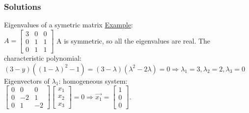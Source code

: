 \begin{frame}
	\frametitle{Solutions}
	\begin{block}{Eigenvalues of a symetric matrix}
		\underline{Example}:\\
		$A=\begin{bmatrix}
		3 & 0 & 0\\
		0 & 1 & 1\\
		0 & 1 & 1
		\end{bmatrix}$ A is symmetric, so all the eigenvalues are real. The characteristic polynomial:\\
		$(3-y)((1-\lambda)^2-1)=(3-\lambda)(\lambda^2-2\lambda)=0 \Rightarrow \lambda_1=3, \lambda_2=2, \lambda_3=0$\\
		Eigenvectors of $\lambda_1$: homogeneous system:\\
		$\begin{bmatrix}
		0 & 0& 0\\
		0 & -2 & 1\\
		0 & 1 & -2
		\end{bmatrix}\begin{bmatrix}
		x_1\\x_2\\x_3
		\end{bmatrix}=0 \Rightarrow \overrightarrow{x_1}=\begin{bmatrix}
		1\\0\\0
		\end{bmatrix}$.
	\end{block}
\end{frame}

